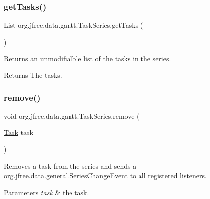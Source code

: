 \subsubsection{\texorpdfstring{get\+Tasks()}{getTasks()}}
{\footnotesize\ttfamily List org.\+jfree.\+data.\+gantt.\+Task\+Series.\+get\+Tasks (\begin{DoxyParamCaption}{ }\end{DoxyParamCaption})}

Returns an unmodifialble list of the tasks in the series.

\begin{DoxyReturn}{Returns}
The tasks. 
\end{DoxyReturn}
\mbox{\label{classorg_1_1jfree_1_1data_1_1gantt_1_1_task_series_a47dc6e33b99cdf3ea0e29b6b81b776c1}} 
\subsubsection{\texorpdfstring{remove()}{remove()}}
{\footnotesize\ttfamily void org.\+jfree.\+data.\+gantt.\+Task\+Series.\+remove (\begin{DoxyParamCaption}\item[{\mbox{\hyperlink{classorg_1_1jfree_1_1data_1_1gantt_1_1_task}{Task}}}]{task }\end{DoxyParamCaption})}

Removes a task from the series and sends a \mbox{\hyperlink{classorg_1_1jfree_1_1data_1_1general_1_1_series_change_event}{org.\+jfree.\+data.\+general.\+Series\+Change\+Event}} to all registered listeners.


\begin{DoxyParams}{Parameters}
{\em task} & the task. \\
\hline
\end{DoxyParams}
\mbox{\label{classorg_1_1jfree_1_1data_1_1gantt_1_1_task_series_a5a5d9fc7998c638af9a4643cbd6712d8}} 
